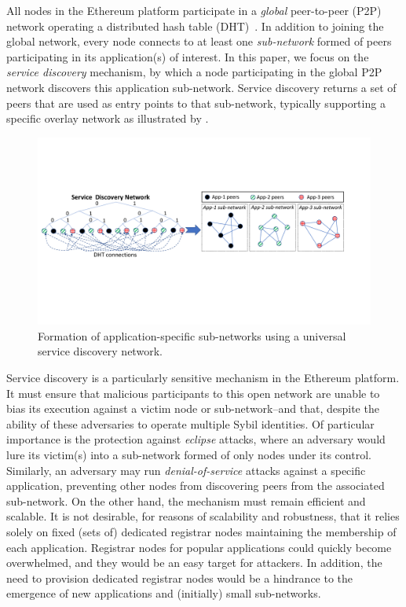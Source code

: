 All nodes in the Ethereum platform participate in a \emph{global} peer-to-peer (P2P) network operating a distributed hash table (DHT)~\cite{maymounkov2002kademlia}.
In addition to joining the global network, every node connects to at least one \emph{sub-network} formed of peers participating in its application(s) of interest.
In this paper, we focus on the \emph{service discovery} mechanism, by which a node participating in the global P2P network discovers this application sub-network.
Service discovery returns a set of peers that are used as entry points to that sub-network, typically supporting a specific overlay network as illustrated by .

\begin{figure}[b!]
    \includegraphics[width=1\linewidth]{img/subnetwork}
    \vspace{-0.15in}
    \caption{Formation of application-specific sub-networks using a universal service discovery network.}
    \label{fig:subnetwork}
    \vspace{-0.15in}
\end{figure}

Service discovery is a particularly sensitive mechanism in the Ethereum platform.
It must ensure that malicious participants to this open network are unable to bias its execution against a victim node or sub-network--and that, despite the ability of these adversaries to operate multiple Sybil identities.
Of particular importance is the protection against \emph{eclipse} attacks, where an adversary would lure its victim(s) into a sub-network formed of only nodes under its control.
Similarly, an adversary may run \emph{denial-of-service} attacks against a specific application, preventing other nodes from discovering peers from the associated sub-network.
On the other hand, the mechanism must remain efficient and scalable.
It is not desirable, for reasons of scalability and robustness, that it relies solely on fixed (sets of) dedicated registrar nodes maintaining the membership of each application.
Registrar nodes for popular applications could quickly become overwhelmed, and they would be an easy target for attackers.
In addition, the need to provision dedicated registrar nodes would be a hindrance to the emergence of new applications and (initially) small sub-networks.

